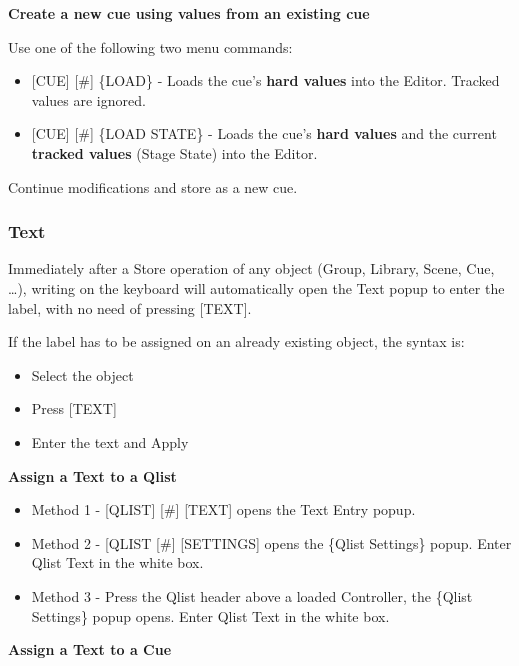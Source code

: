 \documentclass[
]{article}
\begin{document}
\textbf{Create a new cue using values from an existing cue}

Use one of the following two menu commands:

\begin{itemize}
\item
  {[}CUE{]} {[}\#{]} \{LOAD\} - Loads the cue's \textbf{hard values} into the Editor. Tracked values are ignored.
\item
  {[}CUE{]} {[}\#{]} \{LOAD STATE\} - Loads the cue's \textbf{hard values} and the current \textbf{tracked values} (Stage State) into the Editor.
\end{itemize}

Continue modifications and store as a new cue.

\hypertarget{text}{%
\subsubsection{Text}\label{text}}

Immediately after a Store operation of any object (Group, Library, Scene, Cue, \ldots), writing on the keyboard will automatically open the Text popup to enter the label, with no need of pressing {[}TEXT{]}.

If the label has to be assigned on an already existing object, the syntax is:

\begin{itemize}
\item
  Select the object
\item
  Press {[}TEXT{]}
\item
  Enter the text and Apply
\end{itemize}

\textbf{Assign a Text to a Qlist}

\begin{itemize}
\item
  Method 1 - {[}QLIST{]} {[}\#{]} {[}TEXT{]} opens the Text Entry popup.
\item
  Method 2 - {[}QLIST {[}\#{]} {[}SETTINGS{]} opens the \{Qlist Settings\} popup. Enter Qlist Text in the white box.
\item
  Method 3 - Press the Qlist header above a loaded Controller, the \{Qlist Settings\} popup opens. Enter Qlist Text in the white box.
\end{itemize}

\textbf{Assign a Text to a Cue}
\end{document}
